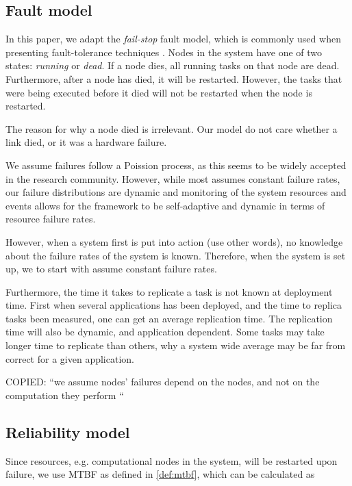 \documentclass{cslthse-msc}
\begin{document}
\subsection{Fault model}
In this paper, we adapt the \emph{fail-stop} fault model, which is commonly used when presenting fault-tolerance techniques \cite{surveyFaultParallel}. Nodes in the system have one of two states: \emph{running} or \emph{dead}. If a node dies, all running tasks on that node are dead. Furthermore, after a node has died, it will be restarted. However, the tasks that were being executed before it died will not be restarted when the node is restarted.

The reason for why a node died is irrelevant. Our model do not care whether a link died, or it was a hardware failure. 

We assume failures follow a Poission process, as this seems to be widely accepted in the research community. However, while most assumes constant failure rates, our failure distributions are dynamic and monitoring of the system resources and events allows for the framework to be self-adaptive and dynamic in terms of resource failure rates.

However, when a system first is put into action (use other words), no knowledge about the failure rates of the system is known. Therefore, when the system is set up, we to start with assume constant failure rates.

Furthermore, the time it takes to replicate a task is not known at deployment time. First when several applications has been deployed, and the time to replica tasks been measured, one can get an average replication time. The replication time will also be dynamic, and application dependent. Some tasks may take longer time to replicate than others, why a system wide average may be far from correct for a given application.

COPIED:
“we assume nodes’ failures depend on the nodes, and not on the computation they perform “\cite{selfAdaptRel}


\subsection{Reliability model}
Since resources, e.g. computational nodes in the system, will be restarted upon failure, we use MTBF as defined in \ref{def:mtbf}, which can be calculated as
\end{document}
